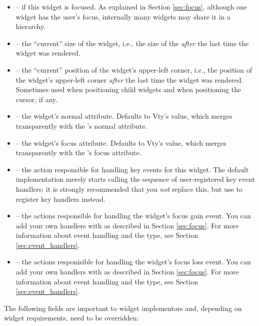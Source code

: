 \begin{itemize}
\item {} --  if this widget is focused.  As
  explained in Section \ref{sec:focus}, although one widget has the
  user's focus, internally many widgets may share it in a hierarchy.
\item {} -- the ``current'' size of the widget, i.e.,
  the size of the  \textit{after} the last time the widget
  was rendered.
\item {} -- the ``current'' position of the widget's
  upper-left corner, i.e., the position of the widget's upper-left
  corner \textit{after} the last time the widget was rendered.
  Sometimes used when positioning child widgets and when positioning
  the cursor, if any.
\item {} -- the widget's normal attribute.  Defaults
  to Vty's  value, which merges transparently with the
  's normal attribute.
\item {} -- the widget's focus attribute.  Defaults
  to Vty's  value, which merges transparently with the
  's focus attribute.
\item {} -- the action responsible for handling key
  events for this widget.  The default implementation merely starts
  calling the sequence of user-registered key event handlers; it is
  strongly recommended that you \textit{not} replace this, but use
   to register key handlers instead.
\item {} -- the actions responsible for handling
  the widget's focus gain event.  You can add your own handlers with
   as described in Section \ref{sec:focus}.  For more
  information about event handling and the  type, see
  Section \ref{sec:event_handlers}.
\item {} -- the actions responisible for handling
  the widget's focus loss event.  You can add your own handlers with
   as described in Section \ref{sec:focus}.  For more
  information about event handling and the  type, see
  Section \ref{sec:event_handlers}.
\end{itemize}

The following fields are important to widget implementors and,
depending on widget requirements, need to be overridden:

